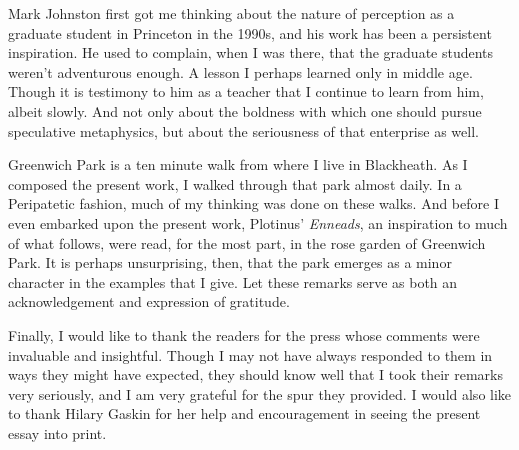 Mark Johnston first got me thinking about the nature of perception as a graduate student in Princeton in the 1990s, and his work has been a persistent inspiration. He used to complain, when I was there, that the graduate students weren't adventurous enough. A lesson I perhaps learned only in middle age. Though it is testimony to him as a teacher that I continue to learn from him, albeit slowly. And not only about the boldness with which one should pursue speculative metaphysics, but about the seriousness of that enterprise as well.

Greenwich Park is a ten minute walk from where I live in Blackheath. As I composed the present work, I walked through that park almost daily. In a Peripatetic fashion, much of my thinking was done on these walks. And before I even embarked upon the present work, Plotinus' \emph{Enneads}, an inspiration to much of what follows, were read, for the most part, in the rose garden of Greenwich Park. It is perhaps unsurprising, then, that the park emerges as a minor character in the examples that I give. Let these remarks serve as both an acknowledgement and expression of gratitude.  

Finally, I would like to thank the readers for the press whose comments were invaluable and insightful. Though I may not have always responded to them in ways they might have expected, they should know well that I took their remarks very seriously, and I am very grateful for the spur they provided. I would also like to thank Hilary Gaskin for her help and encouragement in seeing the present essay into print.

